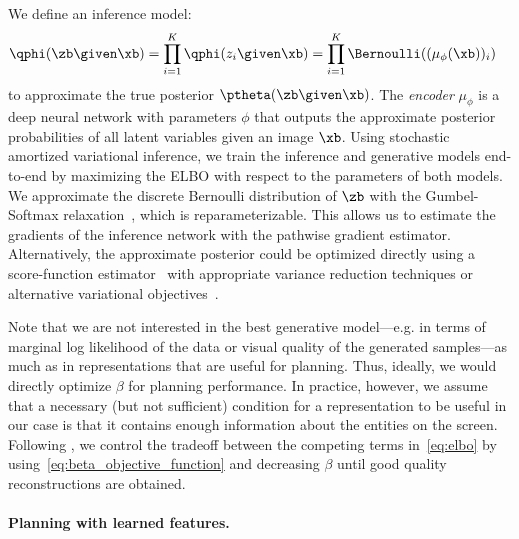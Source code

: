 We define an inference model:
\begin{align*}
    \qphi(\zb \given \xb) 
    &= \prod_{i=1}^K \qphi(z_i \given \xb) 
    = \prod_{i=1}^K \Bernoulli((\mu_\phi(\xb))_i)
\end{align*}
to approximate the true posterior $\ptheta(\zb \given \xb)$.
The \emph{encoder} $\mu_\phi$ is a deep neural network with parameters $\phi$ that outputs the approximate posterior probabilities of all latent variables given an image $\xb$.
Using stochastic amortized variational inference, we train the inference and generative models end-to-end by maximizing the ELBO with respect to the parameters of both models.
We approximate the discrete Bernoulli distribution of $\zb$ with the Gumbel-Softmax relaxation~\cite{jang2016categorical,maddison2016concrete}, which is reparameterizable. This allows us to estimate the gradients of the inference network with the pathwise gradient estimator.
Alternatively, the approximate posterior could be optimized directly using a score-function estimator~\cite{williams1992simple} with appropriate variance reduction techniques or alternative variational objectives~\cite{Bornschein2014-my,Mnih2016-vr,Le2018-kj,Masrani2019-nq,lievin2020optimal}.

Note that we are not interested in the best generative model---e.g. in terms of marginal log likelihood of the data or visual quality of the generated samples---as much as in representations that are useful for planning.
Thus, ideally, we would directly optimize $\beta$ for planning performance. In practice, however, we assume that a necessary (but not sufficient) condition for a representation to be useful in our case is that it contains enough information about the entities on the screen.
Following \citet{burgess2018understanding}, we control the tradeoff between the competing terms in~\eqref{eq:elbo} by using~\eqref{eq:beta_objective_function} and decreasing $\beta$ until good quality reconstructions are obtained.


\paragraph{Planning with learned features.}

